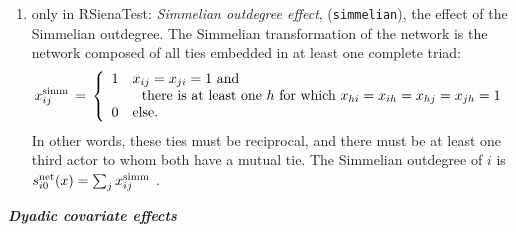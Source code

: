 \documentclass[a4paper,fleqn,11pt]{article}
\newcommand{\+}{\, + \,}
\newcommand{\vit}{\theenumi}
\newcounter{savenumi}
\begin{document}
\begin{enumerate}
\setcounter{enumi}{\value{savenumi}}
\item only in RSienaTest: \emph{Simmelian outdegree effect}, (\texttt{simmelian}), the effect of
      the Simmelian outdegree. The Simmelian transformation of the network is
      the network composed of all ties embedded in at least one complete triad:
\[
    x^{\rm{simm}}_{ij} \,=\, \left\{ \begin{array}{cl}
                               1 & x_{ij} = x_{ji} = 1 \text{ and} \\
                                  & \ \text{ there is at least one }
                                      h \text{ for which } x_{hi} = x_{ih} = x_{hj} = x_{jh} = 1 \\
                               0 & \text{else.}
                             \end{array} \right.
\]
      In other words, these ties must be reciprocal, and there must be at least one
      third actor to whom both have a mutual tie.
      The Simmelian outdegree of $i$ is  \\
$s^{\rm net}_{i\vit}(x ) = \sum_j  x^{\rm{simm}}_{ij} $ .\\

\setcounter{savenumi}{\value{enumi}}
\end{enumerate}
\medskip

\noindent
\textbf{\emph{Dyadic covariate effects}}
\medskip
\end{document}

